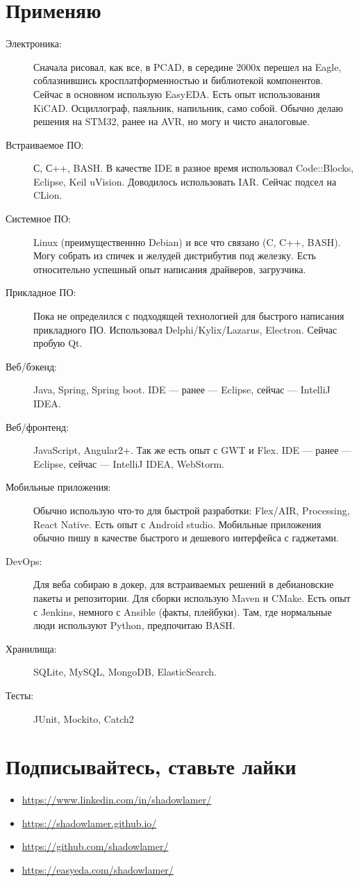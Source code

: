 \documentclass [a4paper,10pt]{article}
\begin{document}
\section*{Применяю}
\begin{description}
\item[Электроника:]
	Сначала рисовал, как все, в PCAD, в середине 2000х перешел на Eagle, соблазнившись кросплатформенностью 
	и библиотекой компонентов. Сейчас в основном использую EasyEDA. Есть опыт использования KiCAD.
	Осциллограф, паяльник, напильник, само собой. Обычно делаю решения на STM32, ранее на AVR, но могу и чисто аналоговые.

\item[Встраиваемое ПО:]
	С, С++, BASH. В качестве IDE в разное время использовал Code::Blocks, Eclipse, Keil uVision. 
	Доводилось использовать IAR. Сейчас подсел на CLion.

\item[Системное ПО:]
	Linux (преимущественнно Debian) и все что связано (C, C++, BASH). Могу собрать из спичек и желудей дистрибутив под железку. 
	Есть относительно успешный опыт написания драйверов, загрузчика. 

\item[Прикладное ПО:]
	Пока не определился с подходящей технологией для быстрого написания прикладного ПО. 
	Использовал Delphi/Kylix/Lazarus, Electron. Сейчас пробую Qt.

\item[Веб/бэкенд:]
	Java, Spring, Spring boot. IDE --- ранее --- Eclipse, сейчас --- IntelliJ IDEA.

\item[Веб/фронтенд:]
	JavaScript, Angular2+. Так же есть опыт с GWT и Flex. IDE --- ранее --- Eclipse, сейчас --- IntelliJ IDEA, WebStorm.

\item[Мобильные приложения:]
	Обычно использую что-то для быстрой разработки: Flex/AIR, Processing, React Native. Есть опыт с Android studio. 
	Мобильные приложения обычно пишу в качестве быстрого и дешевого интерфейса с гаджетами.

\item[DevOps:]
	Для веба собираю в докер, для встраиваемых решений в дебиановские пакеты и репозитории. Для сборки использую Maven и CMake.
	Есть опыт с Jenkins, немного с Ansible (факты, плейбуки). Там, где нормальные люди используют Python, предпочитаю BASH.
	
\item[{Хранилища}:]
	SQLite, MySQL, MongoDB, ElasticSearch.

\item[Тесты:]
	JUnit, Mockito, Catch2
\end{description}

\section*{Подписывайтесь, ставьте лайки}
\begin{itemize}
\item\url{https://www.linkedin.com/in/shadowlamer/}
\item\url{https://shadowlamer.github.io/}
\item\url{https://github.com/shadowlamer/}
\item\url{https://easyeda.com/shadowlamer/}
\end{itemize}
	
\end{document}
